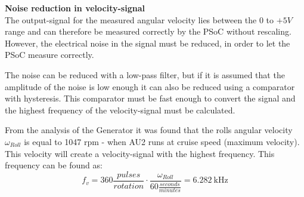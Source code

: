 \textbf{Noise reduction in velocity-signal}\\
The output-signal for the measured angular velocity lies between the $0$ to $+5 V$ range and can therefore be measured correctly by the PSoC without rescaling. However, the electrical noise in the signal must be reduced, in order to let the PSoC measure correctly.

The noise can be reduced with a low-pass filter, but if it is assumed that the amplitude of the noise is low enough it can also be reduced using a comparator with hysteresis. This comparator must be fast enough to convert the signal and the highest frequency of the velocity-signal must be calculated.

From the analysis of the Generator it was found that the rolls angular velocity $\omega_{Roll}$ is equal to 1047 rpm - when AU2 runs at cruise speed (maximum velocity). This velocity will create a velocity-signal with the highest frequency. This frequency can be found as:
\begin{equation}
	f_{v} = 360 \frac{pulses}{rotation} \cdot \frac{\omega_{Roll}}{60\frac{seconds}{minutes}} = \SI{6.282}{\kilo \hertz}
\end{equation}
